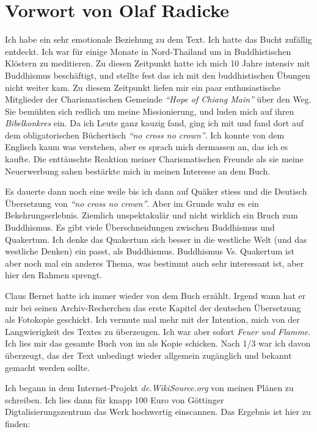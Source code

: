 \chapter{Vorwort von Olaf Radicke}

Ich habe ein sehr emotionale Beziehung zu dem Text. Ich hatte das Bucht zufällig
entdeckt. Ich war für einige Monate in Nord-Thailand um in Buddhistischen
Klöstern zu meditieren. Zu diesen Zeitpunkt hatte ich mich 10 Jahre intensiv mit
Buddhismus beschäftigt, und stellte fest das ich mit den buddhistischen Übungen
nicht weiter kam. Zu diesem Zeitpunkt liefen mir ein paar enthusiastische
Mitglieder der Charismatischen Gemeinde \textit{"`Hope of Chiang Main"'} über
den Weg. Sie bemühten sich redlich um meine Missionierung, und luden mich auf
ihren \textit{Bibelkonkres} ein. Da ich Leute ganz kauzig fand, ging ich mit und
fand dort auf dem obligatorischen Büchertisch \textit{"`no cross no crown"'}.
Ich konnte von dem Englisch kaum was verstehen, aber es sprach mich dermassen
an, das ich es kaufte. Die enttäuschte Reaktion meiner Charismatischen Freunde
als sie meine Neuerwerbung sahen bestärkte mich in meinen Interesse an dem Buch.

\medskip

Es dauerte dann noch eine weile bis ich dann auf Quäker stiess und die Deutisch
Übersetzung von \textit{"`no cross no crown"'}. Aber im Grunde wahr es ein
Bekehrungserlebnis. Ziemlich unspektakulär und nicht wirklich ein Bruch zum
Buddhismus. Es gibt viele Überschneidungen zwischen Buddhismus und Quakertum.
Ich denke das Quakertum sich besser in die westliche Welt (und das westliche
Denken) ein passt, als Buddhismus. Buddhismus Vs. Quakertum ist aber noch mal
ein anderes Thema, was bestimmt auch sehr interessant ist, aber hier den Rahmen
sprengt.

\medskip

Claus Bernet hatte ich immer wieder von dem Buch erzählt. Irgend wann hat er mir
bei seinen Archiv-Recherchen das erste Kapitel der deutschen Übersetzung als
Fotokopie geschickt. Ich vermute mal mehr mit der Intention, mich von der
Langwierigkeit des Textes zu überzeugen. Ich war aber sofort \textit{Feuer und
Flamme}. Ich lies mir das gesamte Buch von im als Kopie schicken. Nach 1/3 war
ich davon überzeugt, das der Text unbedingt wieder allgemein zugänglich und
bekannt gemacht werden sollte.

\medskip

Ich begann in dem Internet-Projekt \textit{de.WikiSource.org} von meinen Plänen
zu schreiben. Ich lies dann für knapp 100 Euro von Göttinger
Digtalisierungszentrum das Werk hochwertig einscannen. Das Ergebnis ist hier zu
finden:

